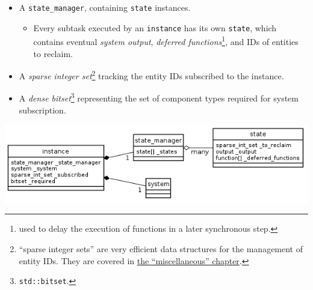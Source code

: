 \documentclass[twoside, 12pt, a4paper, openany]{book}
\let\origfigure=\figure
\let\endorigfigure=\endfigure
\renewenvironment{figure}[1][]{%
\origfigure[H]
}{%
\endorigfigure
}
\providecommand{\tightlist}{%
  \setlength{\itemsep}{0pt}\setlength{\parskip}{0pt}}
\begin{document}
\begin{itemize}
\item
  A
  \texttt{state_manager},
  containing
  \texttt{state}
  instances.

  \begin{itemize}
  \tightlist
  \item
    Every subtask executed by an
    \texttt{instance}
    has its own
    \texttt{state},
    which contains eventual \emph{system output}, \emph{deferred
    functions}\footnote{used to delay the execution of functions in a
      later synchronous step.}, and IDs of entities to reclaim.
  \end{itemize}
\item
  A \emph{sparse integer set}\footnote{``sparse integer sets'' are very
    efficient data structures for the management of entity IDs. They are
    covered in \protect\hyperlink{appendix_sparse_integer_sets}{the
    ``miscellaneous'' chapter}.} tracking the entity IDs subscribed to
  the instance.
\item
  A \emph{dense bitset}\footnote{\texttt{std::bitset}.}
  representing the set of component types required for system
  subscription.
\end{itemize}

\begin{figure}[htbp]
\centering
\includegraphics{source/figures/generated/ecst/architecture/instance.png}
\caption{ECST architecture: system instance}
\end{figure}
\end{document}
